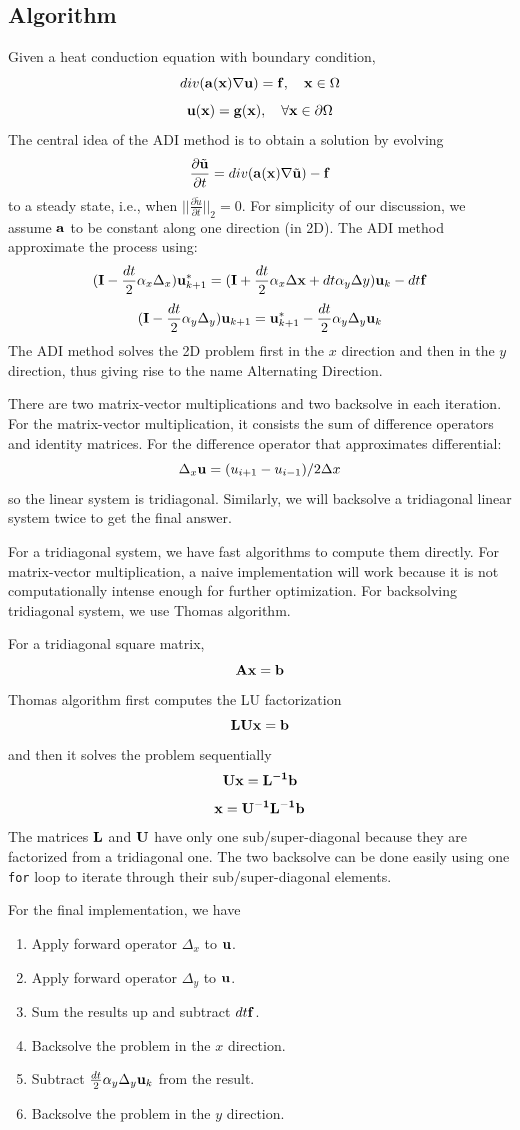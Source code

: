 \documentclass[a4paper,11pt]{article}
\begin{document}
\begin{multicols}{2}
	\subsection{Algorithm}
	Given a heat conduction equation with boundary condition,
	\[div({\bf a}({\bf x})\nabla{\bf u}) = {\bf f},\quad {\bf x}\in\Omega\]
	\[{\bf u}({\bf x}) = {\bf g}({\bf x}),\quad \forall {\bf x}\in\partial \Omega\]
	The central idea of the ADI method is to obtain a solution by evolving
	\[\frac{\partial \tilde{\bf u}}{\partial t} = div({\bf a}({\bf x})\nabla\tilde{\bf u}) - {\bf f}\]
	to a steady state, i.e., when $||\frac{\partial \tilde{u}}{\partial t}||_2 = 0$. For simplicity of our discussion, we assume $\bf a$ to be constant along one direction (in 2D). The ADI method approximate the process using:
	\[({\bf I} - \frac{dt}{2}\alpha_x\Delta_x){\bf u}_{k+1}^* = ({\bf I}+\frac{dt}{2}\alpha_x\Delta{\bf x}+dt\alpha_y\Delta y){\bf u}_k - dt {\bf f}\]
	\[({\bf I} - \frac{dt}{2}\alpha_y\Delta_y){\bf u}_{k+1} = {\bf u}_{k+1}^*-\frac{dt}{2}\alpha_y\Delta_y{\bf u}_k\]
The ADI method solves the 2D problem first in the $x$ direction and then in the $y$ direction, thus giving rise to the name Alternating Direction.
\par There are two matrix-vector multiplications and two backsolve in each iteration. For the matrix-vector multiplication, it consists the sum of difference operators and identity matrices. For the difference operator that approximates differential:
	\[\Delta_x {\bf u} = (u_{i+1}-u_{i-1})/2\Delta x\]
	so the linear system is tridiagonal. Similarly, we will backsolve a tridiagonal linear system twice to get the final answer.
\par For a tridiagonal system, we have fast algorithms to compute them directly. For matrix-vector multiplication, a naive implementation will work because it is not computationally intense enough for further optimization. For backsolving tridiagonal system, we use Thomas algorithm.
\par For a tridiagonal square matrix,
\[\bf Ax = b\] 
Thomas algorithm first computes the LU factorization
\[\bf LUx = b\]
and then it solves the problem sequentially
\[\bf Ux = L^{-1}b\]
\[\bf x = U^{-1}L^{-1}b\]
The matrices $\bf L$ and $\bf U$ have only one sub/super-diagonal because they are factorized from a tridiagonal one. The two backsolve can be done easily using one \texttt{for} loop to iterate through their sub/super-diagonal elements.
\par For the final implementation, we have
\begin{enumerate}
\item Apply forward operator $\Delta_x$ to $\bf u$.
\item Apply forward operator $\Delta_y$ to $\bf u$.
\item Sum the results up and subtract $dt{\bf f}$.
\item Backsolve the problem in the $x$ direction.
\item Subtract $\frac{dt}{2}\alpha_y\Delta_y {\bf u}_k$ from the result.
\item Backsolve the problem in the $y$ direction.
\end{enumerate}

\end{multicols}
\end{document}
